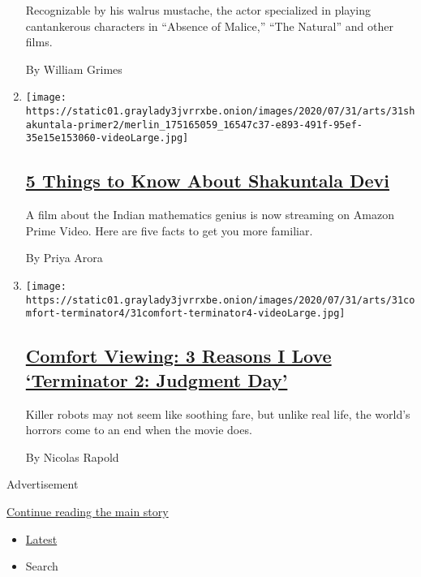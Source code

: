 \begin{enumerate}
  Recognizable by his walrus mustache, the actor specialized in playing
  cantankerous characters in ``Absence of Malice,'' ``The Natural'' and
  other films.

  By William Grimes
\item
  \texttt{[image: https://static01.graylady3jvrrxbe.onion/images/2020/07/31/arts/31shakuntala-primer2/merlin\_175165059\_16547c37-e893-491f-95ef-35e15e153060-videoLarge.jpg]}

  \hypertarget{5-things-to-know-about-shakuntala-devi}{%
  \subsection{\texorpdfstring{\href{/2020/07/31/movies/shakuntala-devi-movie.html}{5
  Things to Know About Shakuntala
  Devi}}{5 Things to Know About Shakuntala Devi}}\label{5-things-to-know-about-shakuntala-devi}}

  A film about the Indian mathematics genius is now streaming on Amazon
  Prime Video. Here are five facts to get you more familiar.

  By Priya Arora
\item
  \texttt{[image: https://static01.graylady3jvrrxbe.onion/images/2020/07/31/arts/31comfort-terminator4/31comfort-terminator4-videoLarge.jpg]}

  \hypertarget{comfort-viewing-3-reasons-i-love-terminator-2-judgment-day}{%
  \subsection{\texorpdfstring{\href{/2020/07/31/movies/comfort-viewing-terminator-2.html}{Comfort
  Viewing: 3 Reasons I Love `Terminator 2: Judgment
  Day'}}{Comfort Viewing: 3 Reasons I Love `Terminator 2: Judgment Day'}}\label{comfort-viewing-3-reasons-i-love-terminator-2-judgment-day}}

  Killer robots may not seem like soothing fare, but unlike real life,
  the world's horrors come to an end when the movie does.

  By Nicolas Rapold
\end{enumerate}

Advertisement

\protect\hyperlink{after-mid1}{Continue reading the main story}

\begin{itemize}
\tightlist
\item
  \protect\hyperlink{stream-panel}{Latest}
\item
  Search
\end{itemize}

